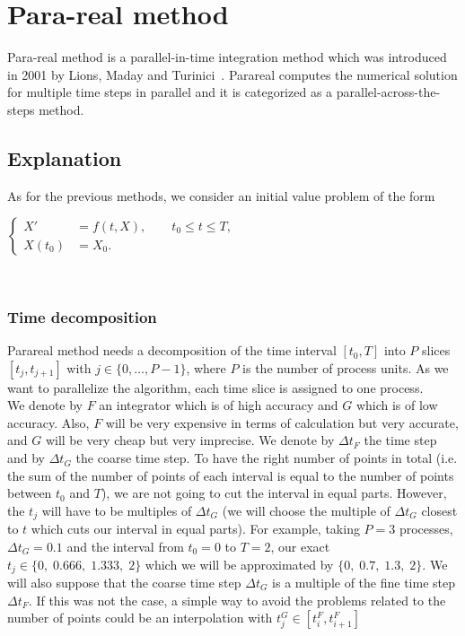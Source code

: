 \section{Para-real method}
	
Para-real method is a parallel-in-time integration method which was introduced in 2001 by Lions, Maday and Turinici~\cite{partie2_ref1}. Parareal computes the numerical solution for multiple time steps in parallel and it is categorized as a parallel-across-the-steps method.

\subsection{Explanation}

As for the previous methods, we consider an initial value problem of the form \\
\begin{minipage}{\linewidth}
	\centering
	$\left\{\begin{aligned}
		X'&=f(t,X), \qquad t_0\le t\le T, \\
		X(t_0)&=X_0.
	\end{aligned}\right.$ \\
\end{minipage} \\

\subsubsection{Time decomposition}

\noindent Parareal method needs a decomposition of the time interval $[t_0,T]$ into $P$ slices $[t_j,t_{j+1}]$ with  $j\in\{0,\dots,P-1\}$, where $P$ is the number of process units. As we want to parallelize the algorithm, each time slice is assigned to one process. \\
We denote by $F$ an integrator which is of high accuracy and $G$ which is of low accuracy. Also, $F$ will be very expensive in terms of calculation but very accurate, and $G$ will be very cheap but very imprecise. We denote by $\Delta t_F$ the time step and by $\Delta t_G$ the coarse time step. To have the right number of points in total (i.e. the sum of the number of points of each interval is equal to the number of points between $t_0$ and $T$), we are not going to cut the interval in equal parts. However, the $t_j$ will have to be multiples of $\Delta t_G$ (we will choose the multiple of $\Delta t_G$ closest to $t$ which cuts our interval in equal parts).
For example, taking $P=3$ processes, $\Delta t_G=0.1$ and the interval from $t_0=0$ to $T=2$, our exact $t_j\in\{0,\;0.666,\;1.333,\;2\}$ which we will be approximated  by $\{0,\;0.7,\;1.3,\;2\}$. We will also suppose that the coarse time step $\Delta t_G$ is a multiple of the fine time step $\Delta t_F$. If this was not the case, a simple way to avoid the problems related to the number of points could be an interpolation with $t_j^G\in[t_i^F,t_{i+1}^F]$

